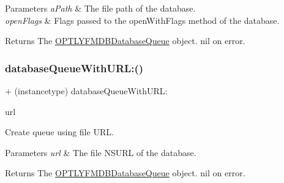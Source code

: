 \begin{DoxyParams}{Parameters}
{\em a\+Path} & The file path of the database. \\
\hline
{\em open\+Flags} & Flags passed to the open\+With\+Flags method of the database.\\
\hline
\end{DoxyParams}
\begin{DoxyReturn}{Returns}
The {\ttfamily \mbox{\hyperlink{interface_o_p_t_l_y_f_m_d_b_database_queue}{O\+P\+T\+L\+Y\+F\+M\+D\+B\+Database\+Queue}}} object. {\ttfamily nil} on error. 
\end{DoxyReturn}
\mbox{\label{interface_o_p_t_l_y_f_m_d_b_database_queue_af55595f0000fc655efb628f84a90a4cd}} 
\subsubsection{\texorpdfstring{database\+Queue\+With\+U\+R\+L\+:()}{databaseQueueWithURL:()}}
{\footnotesize\ttfamily + (instancetype) database\+Queue\+With\+U\+R\+L\+: \begin{DoxyParamCaption}\item[{(N\+S\+U\+RL $\ast$\+\_\+\+Nullable)}]{url }\end{DoxyParamCaption}}

Create queue using file U\+RL.


\begin{DoxyParams}{Parameters}
{\em url} & The file {\ttfamily N\+S\+U\+RL} of the database.\\
\hline
\end{DoxyParams}
\begin{DoxyReturn}{Returns}
The {\ttfamily \mbox{\hyperlink{interface_o_p_t_l_y_f_m_d_b_database_queue}{O\+P\+T\+L\+Y\+F\+M\+D\+B\+Database\+Queue}}} object. {\ttfamily nil} on error. 
\end{DoxyReturn}
\mbox{\label{interface_o_p_t_l_y_f_m_d_b_database_queue_a9ae8cd3cf5543edf1f92ceb7125af1bd}} 
